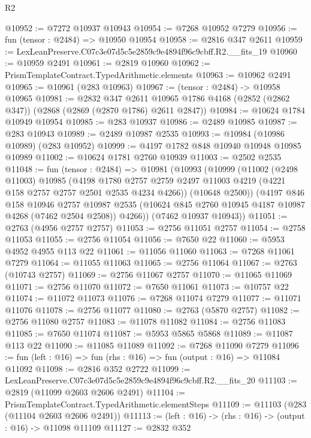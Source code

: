 \begin{lexlean}{R2}
\begin{coremodule}
@10952 := @7272 @10937 @10943
@10954 := @7268 @10952 @7279
@10956 := fun (tensor : @2484) => @10950 @10954
@10958 := @2816 @347 @2611
@10959 := LexLeanPreserve.C07c3e07d5c5e2859c9e4894f96c9cbff.R2.__fits_19
@10960 := @10959 @2491
@10961 := @2819 @10960
@10962 := PrismTemplateContract.TypedArithmetic.elements
@10963 := @10962 @2491
@10965 := @10961 (@283 @10963)
@10967 := (tensor : @2484) -> @10958 @10965
@10981 := @2832
    @347
    @2611
    @10965
    @1786
    @4168
    (@2852 (@2862 @347))
    (@2868 (@2869 (@2870 @1786) @2611 @2847))
@10984 := @10624 @1784 @10949 @10954
@10985 := @283 @10937
@10986 := @2489 @10985
@10987 := @283 @10943
@10989 := @2489 @10987 @2535
@10993 := @10984 (@10986 @10989) (@283 @10952)
@10999 := @4197 @1782 @848 @10940 @10948 @10985 @10989
@11002 := @10624 @1781 @2760 @10939
@11003 := @2502 @2535
@11048 := fun (tensor : @2484) =>
  @10981
    (@10993
      (@10999
        (@11002
          (@2498 @11003)
          @10985
          (@4198
            @1780
            @2757
            @2759
            @2497
            @11003
            @4219
            (@4221 @158 @2757 @2757 @2501 @2535 @4234 @4266))
          (@10648 @2500))
        (@4197
          @846
          @158
          @10946
          @2757
          @10987
          @2535
          (@10624 @845 @2760 @10945 @4187 @10987 @4268 (@7462 @2504 @2508))
          @4266))
      (@7462 @10937 @10943))
@11051 := @2763 (@4956 @2757 @2757)
@11053 := @2756 @11051 @2757
@11054 := @2758 @11053
@11055 := @2756 @11054
@11056 := @7650 @22
@11060 := @5953 @4952 @4955 @113 @22
@11061 := @11056 @11060
@11063 := @7268 @11061 @7279
@11064 := @11055 @11063
@11065 := @2756 @11064
@11067 := @2763 (@10743 @2757)
@11069 := @2756 @11067 @2757
@11070 := @11065 @11069
@11071 := @2756 @11070
@11072 := @7650 @11061
@11073 := @10757 @22
@11074 := @11072 @11073
@11076 := @7268 @11074 @7279
@11077 := @11071 @11076
@11078 := @2756 @11077
@11080 := @2763 (@5870 @2757)
@11082 := @2756 @11080 @2757
@11083 := @11078 @11082
@11084 := @2756 @11083
@11085 := @7650 @11074
@11087 := @5953 @5865 @5868
@11089 := @11087 @113 @22
@11090 := @11085 @11089
@11092 := @7268 @11090 @7279
@11096 := fun (left : @16) => fun (rhs : @16) => fun (output : @16) => @11084 @11092
@11098 := @2816 @352 @2722
@11099 := LexLeanPreserve.C07c3e07d5c5e2859c9e4894f96c9cbff.R2.__fits_20
@11103 := @2819 (@11099 @2603 @2606 @2491)
@11104 := PrismTemplateContract.TypedArithmetic.elementSteps
@11109 := @11103 (@283 (@11104 @2603 @2606 @2491))
@11113 := (left : @16) -> (rhs : @16) -> (output : @16) -> @11098 @11109
@11127 := @2832
    @352

\end{coremodule}
\end{lexlean}
